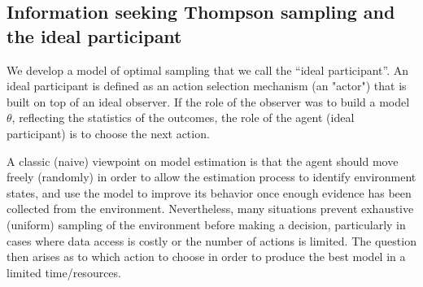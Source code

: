 \documentclass[10pt,letterpaper]{article}
\begin{document}

\subsection{Information seeking Thompson sampling and the ideal participant}
We  develop a model of optimal sampling that we call the ``ideal participant''. An ideal participant is defined as an action selection mechanism (an "actor") that is built on top of an ideal observer.
If the role of the observer was to build a  model $\theta$, reflecting the statistics of the outcomes, %
the role of the agent (ideal participant) is to choose the next action.

A classic (naive) viewpoint on model estimation is that the agent should move freely (randomly) in order to allow the estimation process to identify environment states, and use the model to improve its behavior once enough evidence has been collected from the environment. %
Nevertheless, many situations prevent exhaustive (uniform) sampling of the environment before making a decision, particularly in cases where data access is costly or the number of actions is limited. The question then arises as to which action to choose in order to produce the best model in a limited time/resources.
\end{document}
